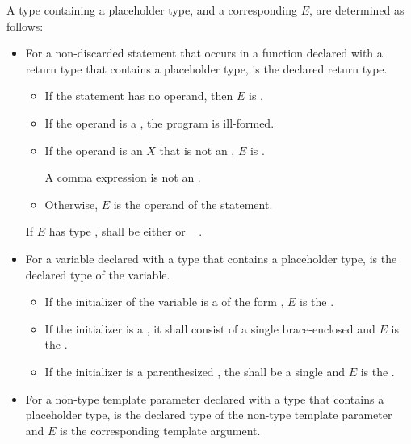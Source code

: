 \pnum
A type  containing a placeholder type,
and a corresponding  $E$,
are determined as follows:
\begin{itemize}
\item
For a non-discarded  statement that occurs
in a function declared with a return type
that contains a placeholder type,
 is the declared return type.
\begin{itemize}
\item
If the  statement has no operand,
then $E$ is .
\item
If the operand is a ,
the program is ill-formed.
\item
If the operand is an  $X$
that is not an ,
$E$ is .
\begin{note}
A comma expression is not
an .
\end{note}
\item
Otherwise, $E$ is the operand of the  statement.
\end{itemize}
If $E$ has type ,
 shall be either
  or
\cv{}~ .
\item
For a variable declared with a type
that contains a placeholder type,
 is the declared type of the variable.
\begin{itemize}
\item
If the initializer of the variable is a 
of the form ,
$E$ is the .
\item
If the initializer is a ,
it shall consist of a single brace-enclosed 
and $E$ is the .
\item
If the initializer is a parenthesized ,
the  shall be
a single 
and $E$ is the .
\end{itemize}
\item
For a non-type template parameter declared with a type
that contains a placeholder type,
 is the declared type of the non-type template parameter
and $E$ is the corresponding template argument.
\end{itemize}

